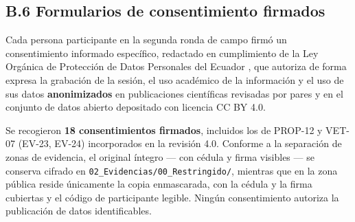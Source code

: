 \documentclass[journal,onecolumn]{IEEEtran}
\begin{document}
	\subsection*{B.6 Formularios de consentimiento firmados}
	
	Cada persona participante en la segunda ronda de campo firmó un consentimiento
	informado específico, redactado en cumplimiento de la Ley Orgánica de
	Protección de Datos Personales del Ecuador \cite{lopdp2021}, que autoriza de
	forma expresa la grabación de la sesión, el uso académico de la información y
	el uso de sus datos \textbf{anonimizados} en publicaciones científicas
	revisadas por pares y en el conjunto de datos abierto depositado con licencia
	CC BY 4.0.
	
	Se recogieron \textbf{18 consentimientos firmados}, incluidos los de
	PROP-12 y VET-07 (EV-23, EV-24) incorporados en la revisión 4.0. Conforme
	a la separación
	de zonas de evidencia, el original íntegro --- con cédula y firma visibles ---
	se conserva cifrado en \texttt{02\_Evidencias/00\_Restringido/}, mientras que
	en la zona pública reside únicamente la copia enmascarada, con la cédula y la
	firma cubiertas y el código de participante legible. Ningún consentimiento
	autoriza la publicación de datos identificables.
	
\end{document}
